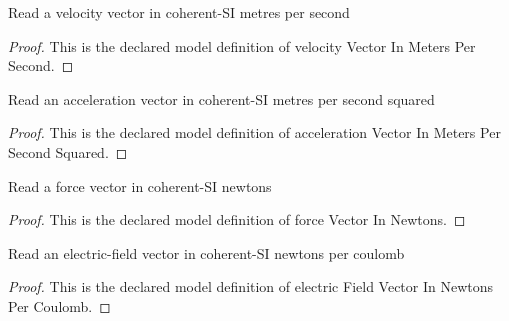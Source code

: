 \begin{definition}
  \label{def:physics:phyx-mini-0909:phyxminiproblems-problemphyxmini0909-velocityvectorinmeterspersecond}
  Read a velocity vector in coherent-SI metres per second
\end{definition}
\begin{proof}
  This is the declared model definition of velocity Vector In Meters Per Second.
\end{proof}
\begin{definition}
  \label{def:physics:phyx-mini-0909:phyxminiproblems-problemphyxmini0909-accelerationvectorinmeterspersecondsquared}
  Read an acceleration vector in coherent-SI metres per second squared
\end{definition}
\begin{proof}
  This is the declared model definition of acceleration Vector In Meters Per Second Squared.
\end{proof}
\begin{definition}
  \label{def:physics:phyx-mini-0909:phyxminiproblems-problemphyxmini0909-forcevectorinnewtons}
  Read a force vector in coherent-SI newtons
\end{definition}
\begin{proof}
  This is the declared model definition of force Vector In Newtons.
\end{proof}
\begin{definition}
  \label{def:physics:phyx-mini-0909:phyxminiproblems-problemphyxmini0909-electricfieldvectorinnewtonspercoulomb}
  Read an electric-field vector in coherent-SI newtons per coulomb
\end{definition}
\begin{proof}
  This is the declared model definition of electric Field Vector In Newtons Per Coulomb.
\end{proof}
